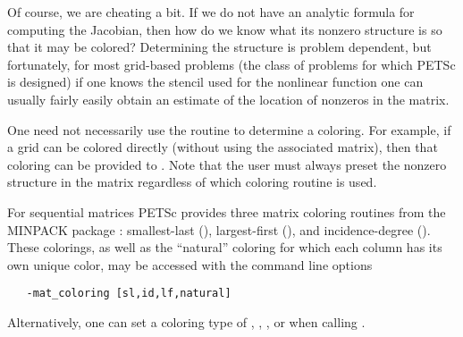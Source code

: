   
 

Of course, we are cheating a bit. If we do not have an analytic
formula for computing the Jacobian, then how do we know what its
nonzero structure is so that it may be colored?  Determining the
structure is problem dependent, but fortunately, for most grid-based
problems (the class of problems for which PETSc is designed) if one
knows the stencil used for the nonlinear function one can usually
fairly easily obtain an estimate of the location of nonzeros in
the matrix.

One need not necessarily use the routine  to
determine a coloring.  For example, if a grid can be colored directly
(without using the associated matrix), then that coloring can be provided
to .  Note that the user must always
preset the nonzero structure in the matrix regardless of which
coloring routine is used.

For sequential matrices PETSc provides three matrix coloring routines from the 
MINPACK package \cite{more84}: smallest-last (), largest-first (),
and incidence-degree ().  These colorings, as well as the ``natural'' coloring 
for which each column has its own unique color, may be accessed with the command line options
\begin{verbatim}
   -mat_coloring [sl,id,lf,natural]
\end{verbatim}
Alternatively, one can set a coloring type of , , , or  
when calling .   
 

